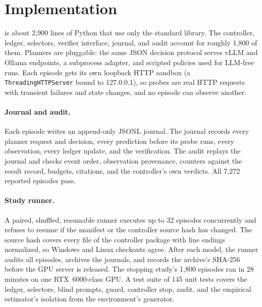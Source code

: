 \section{Implementation}
\label{sec:impl}

\hesp{} is about 2{,}900 lines of Python that use only the standard library. The controller, ledger, selectors, verifier interface, journal, and audit account for roughly 1{,}800 of them. Planners are pluggable: the same JSON decision protocol serves vLLM and Ollama endpoints, a subprocess adapter, and scripted policies used for LLM-free runs. Each episode gets its own loopback HTTP sandbox (a \texttt{ThreadingHTTPServer} bound to 127.0.0.1), so probes are real HTTP requests with transient failures and state changes, and no episode can observe another.

\paragraph{Journal and audit.} Each episode writes an append-only JSONL journal. The journal records every planner request and decision, every prediction before its probe runs, every observation, every ledger update, and the verification. The audit replays the journal and checks event order, observation provenance, counters against the result record, budgets, citations, and the controller's own verdicts. All 7{,}272 reported episodes pass.

\paragraph{Study runner.} A paired, shuffled, resumable runner executes up to 32 episodes concurrently and refuses to resume if the manifest or the controller source hash has changed. The source hash covers every file of the controller package with line endings normalized, so Windows and Linux checkouts agree. After each model, the runner audits all episodes, archives the journals, and records the archive's SHA-256 before the GPU server is released. The stopping study's 1{,}800 episodes ran in 28 minutes on one RTX~6000-class GPU. A test suite of 145 unit tests covers the ledger, selectors, blind prompts, guard, controller stop, audit, and the empirical estimator's isolation from the environment's generator.
